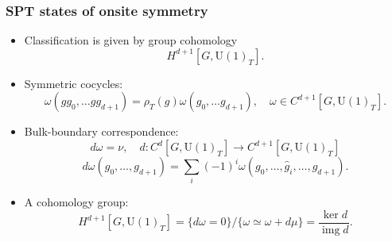 \documentclass[xcolor=table, 10pt, aspectratio=43]{beamer}
\newcommand{\uone}{\mathrm U(1)}
\DeclareMathOperator{\img}{img}
\begin{document}
\begin{frame}
  \frametitle{SPT states of onsite symmetry}
  \begin{itemize}
    \item Classification is given by group cohomology
    \[H^{d+1}[G, \uone_T].\]
		\item Symmetric cocycles:
		\[\omega(gg_0,\ldots gg_{d+1})=\rho_T(g)\omega(g_0,\ldots g_{d+1}),\quad
		\omega\in C^{d+1}[G, \uone_T].\]
		\item Bulk-boundary correspondence:
		\[d\omega = \nu,\quad d:C^d[G, \uone_T]\rightarrow C^{d+1}[G, \uone_T]\]
		\[d\omega(g_0,\ldots,g_{d+1})
		=\sum_i(-1)^i\omega(g_0,\ldots,\hat g_i,\ldots,g_{d+1}).\]
\begin{center}
\end{center}
  \item A cohomology group:
\[H^{d+1}[G,\uone_T]=\{d\omega=0\}/\{\omega\simeq\omega+d\mu\}=\frac{\ker d}{\img d}.\]
  \end{itemize}
\end{frame}
\end{document}
